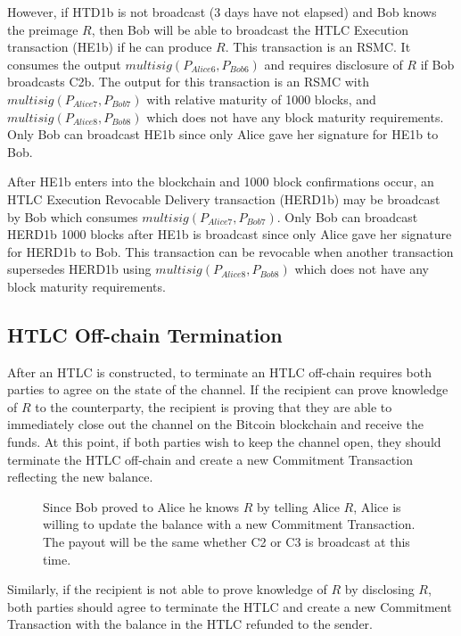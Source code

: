 \documentclass[letterpaper,11pt]{article}
\begin{document}
However, if HTD1b is not broadcast (3 days have not elapsed) and Bob knows the
preimage $R$, then Bob will be able to broadcast the HTLC Execution transaction
(HE1b) if he can produce $R$. This transaction is an RSMC. It consumes the
output $multisig(P_{Alice6}, P_{Bob6})$ and requires disclosure of $R$ if Bob
broadcasts C2b. The output for this transaction is an RSMC with
$multisig(P_{Alice7}, P_{Bob7})$ with relative maturity of 1000 blocks, and
$multisig(P_{Alice8}, P_{Bob8})$ which does not have any block maturity
requirements. Only Bob can broadcast HE1b since only Alice gave her signature
for HE1b to Bob.

After HE1b enters into the blockchain and 1000 block confirmations occur, an
HTLC Execution Revocable Delivery transaction (HERD1b) may be broadcast by Bob
which consumes $multisig(P_{Alice7}, P_{Bob7})$. Only Bob can broadcast HERD1b
1000 blocks after HE1b is broadcast since only Alice gave her signature for
HERD1b to Bob. This transaction can be revocable when another transaction
supersedes HERD1b using $multisig(P_{Alice8}, P_{Bob8})$ which does not have any
block maturity requirements.

\subsection{HTLC Off-chain Termination}

After an HTLC is constructed, to terminate an HTLC off-chain requires both
parties to agree on the state of the channel. If the recipient can prove
knowledge of $R$ to the counterparty, the recipient is proving that they are
able to immediately close out the channel on the Bitcoin blockchain and receive
the funds. At this point, if both parties wish to keep the channel open, they
should terminate the HTLC off-chain and create a new Commitment Transaction
reflecting the new balance.

\begin{figure}[H]
	\caption{Since Bob proved to Alice he knows $R$ by telling Alice $R$,
		Alice is willing to update the balance with a new Commitment
		Transaction. The payout will be the same whether C2 or C3 is
		broadcast at this time.
	}
\end{figure}

Similarly, if the recipient is not able to prove knowledge of $R$ by disclosing
$R$, both parties should agree to terminate the HTLC and create a new Commitment
Transaction with the balance in the HTLC refunded to the sender.
\end{document}
